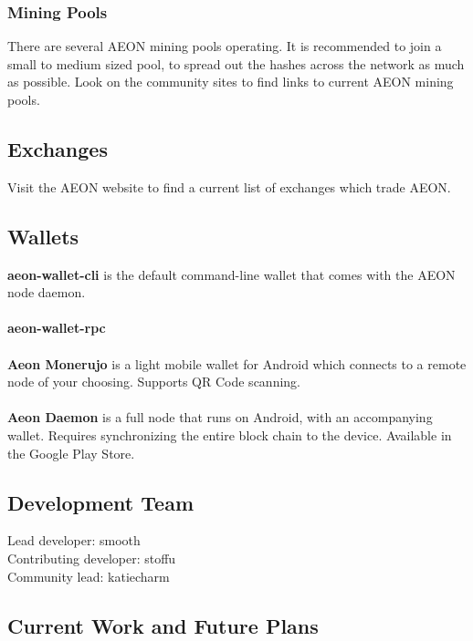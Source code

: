 \subsubsection{Mining Pools}
There are several AEON mining pools operating. It is recommended to join a small to medium sized pool, to spread out the hashes across the network as much as possible.  Look on the community sites to find links to current AEON mining pools.

\subsection{Exchanges}
Visit the AEON website to find a current list of exchanges which trade AEON.

\subsection{Wallets}
\textbf{aeon-wallet-cli} is the default command-line wallet that comes with the AEON node daemon.\\
\\
\textbf{aeon-wallet-rpc}\\
\\
\textbf{Aeon Monerujo} is a light mobile wallet for Android which connects to a remote node of your choosing. Supports QR Code scanning.\\
\\
\textbf{Aeon Daemon} is a full node that runs on Android, with an accompanying wallet. Requires synchronizing the entire block chain to the device.  Available in the Google Play Store.\\

\subsection{Development Team}
Lead developer:		smooth\\
Contributing developer:	stoffu\\
Community lead:		katiecharm\\

\subsection{Current Work and Future Plans}
